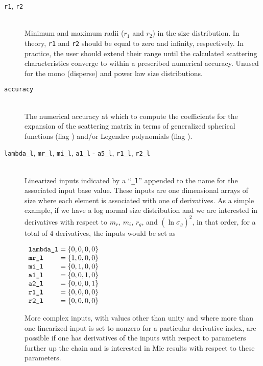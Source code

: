 \begin{description}
\item[\texttt{r1}, \texttt{r2}] \hfill \\
Minimum and maximum radii ($r_{1}$ and $r_{2}$) in the size distribution.  In theory, \texttt{r1} and \texttt{r2} should be equal to zero and infinity, respectively.  In practice, the user should extend their range until the calculated scattering characteristics converge to within a prescribed numerical accuracy.  Unused for the mono (disperse) and power law size distributions.

\item[\texttt{accuracy}] \hfill \\
The numerical accuracy at which to compute the coefficients for the expansion of the scattering matrix in terms of generalized spherical functions (flag ) and/or Legendre polynomials (flag ).

\item[\texttt{lambda\_l}, \texttt{mr\_l}, \texttt{mi\_l}, \texttt{a1\_l} - \texttt{a5\_l}, \texttt{r1\_l}, \texttt{r2\_l}] \hfill \\
Linearized inputs indicated by a ``\texttt{\_l}'' appended to the name for the associated input base value.  These inputs are one dimensional arrays of size  where each element is associated with one of  derivatives.  As a simple example, if we have a log normal size distribution and we are interested in derivatives with respect to $m_{r}$, $m_{i}$, $r_{g}$, and $(\ln \sigma_{g})^{2}$, in that order, for a total of 4 derivatives, the inputs would be set as
\begin{indentall}
\(
\begin{array}{l@{\hspace{.25em}}c@{\hspace{.25em}}l}
\texttt{lambda\_l} &=& \{0, 0, 0, 0\} \\
\texttt{mr\_l}     &=& \{1, 0, 0, 0\} \\
\texttt{mi\_l}     &=& \{0, 1, 0, 0\} \\
\texttt{a1\_l}     &=& \{0, 0, 1, 0\} \\
\texttt{a2\_l}     &=& \{0, 0, 0, 1\} \\
\texttt{r1\_l}     &=& \{0, 0, 0, 0\} \\
\texttt{r2\_l}     &=& \{0, 0, 0, 0\}
\end{array}
\)
\end{indentall}
More complex inputs, with values other than unity and where more than one linearized input is set to nonzero for a particular derivative index, are possible if one has derivatives of the inputs with respect to parameters further up the chain and is interested in Mie results with respect to these parameters.

\end{description}


